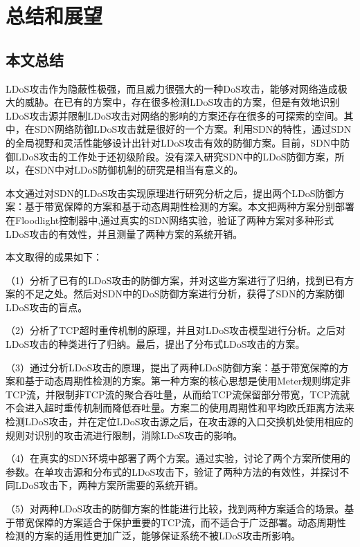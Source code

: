 \chapter{总结和展望}
\label{cha:conclusion}

\section{本文总结}
\label{chap6:conclusion}

LDoS攻击作为隐蔽性极强，而且威力很强大的一种DoS攻击，能够对网络造成极大的威胁。在已有的方案中，存在很多检测LDoS攻击的方案，但是有效地识别LDoS攻击源并限制LDoS攻击对网络的影响的方案还存在很多的可探索的空间。其中，在SDN网络防御LDoS攻击就是很好的一个方案。利用SDN的特性，通过SDN的全局视野和灵活性能够设计出针对LDoS攻击有效的防御方案。目前，SDN中防御LDoS攻击的工作处于还初级阶段。没有深入研究SDN中的LDoS防御方案，所以，在SDN中对LDoS防御机制的研究是相当有意义的。

本文通过对SDN的LDoS攻击实现原理进行研究分析之后，提出两个LDoS防御方案：基于带宽保障的方案和基于动态周期性检测的方案。本文把两种方案分别部署在Floodlight控制器中,通过真实的SDN网络实验，验证了两种方案对多种形式LDoS攻击的有效性，并且测量了两种方案的系统开销。

\noindent 本文取得的成果如下：

（1）分析了已有的LDoS攻击的防御方案，并对这些方案进行了归纳，找到已有方案的不足之处。然后对SDN中的DoS防御方案进行分析，获得了SDN的方案防御LDoS攻击的盲点。

（2）分析了TCP超时重传机制的原理，并且对LDoS攻击模型进行分析。之后对LDoS攻击的种类进行了归纳。最后，提出了分布式LDoS攻击的方案。

（3）通过分析LDoS攻击的原理，提出了两种LDoS防御方案：基于带宽保障的方案和基于动态周期性检测的方案。第一种方案的核心思想是使用Meter规则绑定非TCP流，并限制非TCP流的聚合吞吐量，从而给TCP流保留部分带宽，TCP流就不会进入超时重传机制而降低吞吐量。方案二的使用周期性和平均欧氏距离方法来检测LDoS攻击，并在定位LDoS攻击源之后，在攻击源的入口交换机处使用相应的规则对识别的攻击流进行限制，消除LDoS攻击的影响。

（4）在真实的SDN环境中部署了两个方案。通过实验，讨论了两个方案所使用的参数。在单攻击源和分布式的LDoS攻击下，验证了两种方法的有效性，并探讨不同LDoS攻击下，两种方案所需要的系统开销。

（5）对两种LDoS攻击的防御方案的性能进行比较，找到两种方案适合的场景。基于带宽保障的方案适合于保护重要的TCP流，而不适合于广泛部署。动态周期性检测的方案的适用性更加广泛，能够保证系统不被LDoS攻击所影响。


